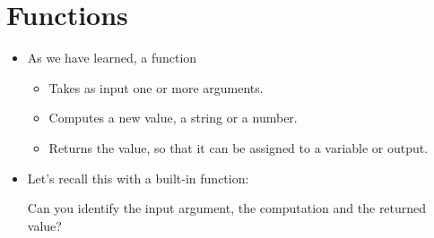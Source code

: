 \documentclass[letterpaper,10pt,english]{sphinxmanual}
\begin{document}
\section{Functions}
\label{\detokenize{lecture_notes/lec05_functions2:functions}}\begin{itemize}
\item {} 
As we have learned, a function
\begin{itemize}
\item {} 
Takes as input one or more arguments.

\item {} 
Computes a new value, a string or a number.

\item {} 
Returns the value, so that it can be assigned to a variable or
output.

\end{itemize}

\item {} 
Let’s recall this with a built-in function:

%
\begin{sphinxVerbatim}[commandchars=\\\{\}]
\end{sphinxVerbatim}

Can you identify the input argument, the computation and the
returned value?

\end{itemize}
\end{document}
